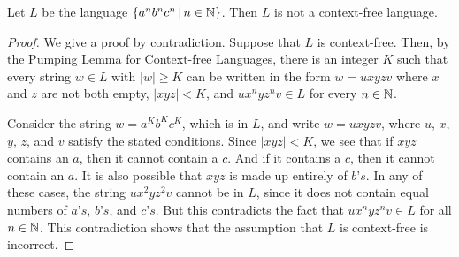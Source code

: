 \begin{corrolary}\label{T-CFG-anbncn}
Let $L$ be the language $\{a^nb^nc^n \,|\, n\in{\mathbb N}\}$.  Then
$L$ is not a context-free language.
\end{corrolary}
\begin{proof}
We give a proof by contradiction.  Suppose that $L$ is
context-free.  Then, by the Pumping Lemma for Context-free Languages,
there is an integer $K$ such that every string $w\in L$ with 
$|w|\ge K$ can be written in the form $w=uxyzv$ where
$x$ and $z$ are not both empty, $|xyz|<K$, and $ux^nyz^nv\in L$
for every $n\in{\mathbb N}$.

Consider the string $w=a^Kb^Kc^K$, which is in $L$,
and write $w=uxyzv$, where $u$, $x$, $y$, $z$, and $v$ satisfy the
stated conditions.  Since $|xyz|<K$, we see that if $xyz$
contains an $a$, then it cannot contain a $c$.  And if it
contains a $c$, then it cannot contain an $a$.  It is also possible
that $xyz$ is made up entirely of $b\text{'}s$.  In any of these cases,
the string $ux^2yz^2v$ cannot be in $L$, since it does not contain
equal numbers of $a\text{'}s$, $b\text{'}s$, and $c\text{'}s$.  But this contradicts
the fact that $ux^nyz^nv\in L$ for all $n\in{\mathbb N}$.  This contradiction
shows that the assumption that $L$ is context-free is incorrect.
\end{proof}
\smallskip

